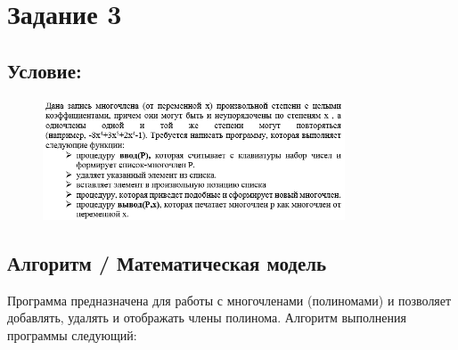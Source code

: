 \documentclass[14pt,a4paper]{article}
\begin{document}
\section*{Задание 3}

\setcounter{subsection}{0} %

\subsection{Условие:}
\begin{figure}[h]
    \centering
    \includegraphics[width=0.8\textwidth]{data/condition16_3.png}
\end{figure}

\subsection{Алгоритм / Математическая модель}

Программа предназначена для работы с многочленами (полиномами) и позволяет добавлять, удалять и отображать члены полинома. Алгоритм выполнения программы следующий:
\end{document}
